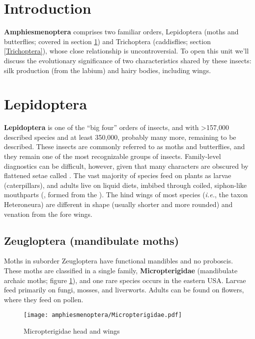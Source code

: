 \section*{Introduction}
\textbf{Amphiesmenoptera} comprises two familiar orders, Lepidoptera (moths and butterflies; covered in section \ref{Lepidoptera}) and Trichoptera (caddisflies; section \ref{Trichoptera}), whose close relationship is uncontroversial. To open this unit we'll discuss the evolutionary significance of two characteristics shared by these insects: silk production (from the labium) and hairy bodies, including wings.

\section{Lepidoptera}\label{Lepidoptera}

\noindent{}\textbf{Lepidoptera} is one of the ``big four'' orders of insects, and with \textgreater157,000 described species \citep{van2011order} and at least 350,000, probably many more, remaining to be described. These insects are commonly referred to as moths and butterflies, and they remain one of the most recognizable groups of insects. Family-level diagnostics can be difficult, however, given that many characters are obscured by flattened setae called . The vast majority of species feed on plants as larvae (caterpillars), and adults live on liquid diets, imbibed through coiled, siphon-like mouthparts (, formed from the ). The hind wings of most species (\textit{i.e.}, the taxon Heteroneura) are different in shape (usually shorter and more rounded) and venation from the fore wings.

\subsection{Zeugloptera (mandibulate moths)}
Moths in suborder Zeugloptera have functional mandibles and no proboscis. These moths are classified in a single family, \textbf{Micropterigidae} (mandibulate archaic moths; figure \ref{fig:micropterigid}), and one rare species occurs in the eastern USA. Larvae feed primarily on fungi, mosses, and liverworts. Adults can be found on flowers, where they feed on pollen. 

\begin{figure}[ht!]
  \centering
    \texttt{[image: amphiesmenoptera/Micropterigidae.pdf]}
  \caption{Micropterigidae head and wings \citep[modified from][Fig. 13,16]{davis2012review}}
  \label{fig:micropterigid}
\end{figure}

